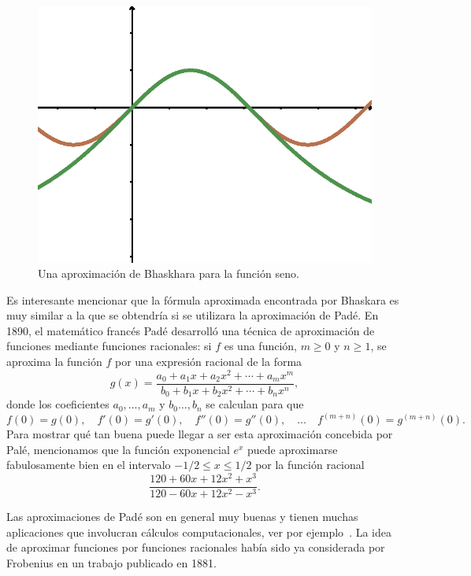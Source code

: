 \begin{figure}[h]
   \centering
   \includegraphics[scale=0.6]{images/baskhara}
   \caption{Una aproximación de Bhaskhara para la función seno.}
   \label{fig:baskhara}
\end{figure}

Es interesante mencionar que la fórmula aproximada encontrada por Bhaskara es
muy similar a la que se obtendría si se utilizara la aproximación de Padé. En
1890, el matemático francés Padé desarrolló una técnica de aproximación de
funciones mediante funciones racionales: si $f$ es una función, $m\geq0$ y
$n\geq1$, se aproxima la función $f$ por una expresión racional de la forma
\[
	g(x)=\frac{a_0+a_1x+a_2x^2+\cdots+a_mx^m}{b_0+b_1x+b_2x^2+\cdots+b_nx^n},
\]
donde los coeficientes $a_0,\dots,a_m$ y $b_0\dots,b_n$ se calculan para que
\[
	f(0)=g(0),\quad
	f'(0)=g'(0),\quad
	f''(0)=g''(0),\quad
	\dots
	\quad
	f^{(m+n)}(0)=g^{(m+n)}(0).
\]
Para mostrar qué tan buena puede llegar a ser esta aproximación concebida por
Palé, mencionamos que la función exponencial $e^x$ puede aproximarse fabulosamente
bien en el intervalo $-1/2\leq x\leq 1/2$ por la función racional
\[
	\frac{120+60x+12x^2+x^3}{120-60x+12x^2-x^3}.
\]

Las aproximaciones de Padé son en general muy buenas y tienen muchas
aplicaciones que involucran cálculos computacionales, ver por
ejemplo~\cite{MR1383091}.  La idea de aproximar funciones por funciones
racionales había sido ya considerada por Frobenius en un trabajo publicado en
1881.  

